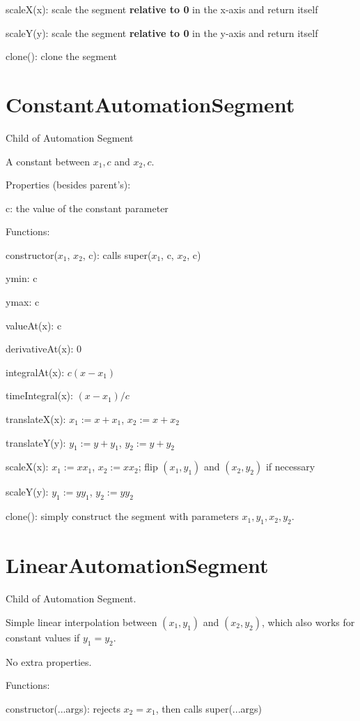 \documentclass{article}
\begin{document}
scaleX(x): scale the segment \textbf{relative to 0} in the x-axis and return itself

scaleY(y): scale the segment \textbf{relative to 0} in the y-axis and return itself

clone(): clone the segment


\section{ConstantAutomationSegment}

Child of Automation Segment

A constant between $x_1, c$ and $x_2, c$.

Properties (besides parent's):

c: the value of the constant parameter

Functions:

constructor($x_1$, $x_2$, c): calls super($x_1$, c, $x_2$, c)

ymin: c

ymax: c

valueAt(x): c

derivativeAt(x): 0

integralAt(x): $c(x-x_1)$

timeIntegral(x): $(x-x_1)/c$

translateX(x): $x_1:=x+x_1$, $x_2:=x+x_2$

translateY(y): $y_1:=y+y_1$, $y_2:=y+y_2$

scaleX(x): $x_1:=xx_1$, $x_2:=xx_2$; flip $(x_1, y_1)$ and $(x_2, y_2)$ if necessary

scaleY(y): $y_1:=yy_1$, $y_2:=yy_2$

clone(): simply construct the segment with parameters $x_1, y_1, x_2, y_2$.

\section{LinearAutomationSegment}

Child of Automation Segment.

Simple linear interpolation between $(x_1, y_1)$ and $(x_2, y_2)$, which also works for constant values if $y_1=y_2$.

No extra properties.

Functions:

constructor(...args): rejects $x_2 = x_1$, then calls super(...args)
\end{document}
